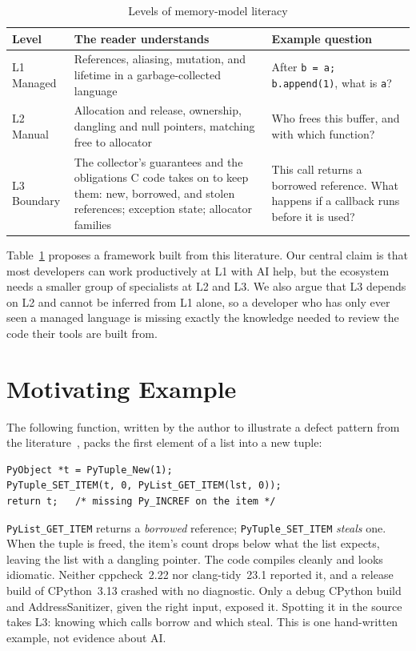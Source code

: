 \documentclass[conference]{IEEEtran}
\begin{document}
\begin{table}[t]
\caption{Levels of memory-model literacy}
\label{tab:levels}
\centering\footnotesize
\begin{tabular}{@{}p{}p{}p{}@{}}
\toprule
Level & The reader understands & Example question \\
\midrule
L1 Managed & References, aliasing, mutation, and lifetime in a garbage-collected language & After \texttt{b = a; b.append(1)}, what is \texttt{a}? \\
L2 Manual & Allocation and release, ownership, dangling and null pointers, matching free to allocator & Who frees this buffer, and with which function? \\
L3 Boundary & The collector's guarantees and the obligations C code takes on to keep them: new, borrowed, and stolen references; exception state; allocator families & This call returns a borrowed reference. What happens if a callback runs before it is used? \\
\bottomrule
\end{tabular}
\end{table}

Table~\ref{tab:levels} proposes a framework built from this literature. Our central claim is that most developers can work productively at L1 with AI help, but the ecosystem needs a smaller group of specialists at L2 and L3. We also argue that L3 depends on L2 and cannot be inferred from L1 alone, so a developer who has only ever seen a managed language is missing exactly the knowledge needed to review the code their tools are built from.

\section{Motivating Example}

The following function, written by the author to illustrate a defect pattern from the literature~\cite{huzhang2023}, packs the first element of a list into a new tuple:

\begin{lstlisting}
PyObject *t = PyTuple_New(1);
PyTuple_SET_ITEM(t, 0, PyList_GET_ITEM(lst, 0));
return t;   /* missing Py_INCREF on the item */
\end{lstlisting}

\texttt{PyList\_GET\_ITEM} returns a \emph{borrowed} reference; \texttt{PyTuple\_SET\_ITEM} \emph{steals} one. When the tuple is freed, the item's count drops below what the list expects, leaving the list with a dangling pointer. The code compiles cleanly and looks idiomatic. Neither cppcheck~2.22 nor clang-tidy~23.1 reported it, and a release build of CPython~3.13 crashed with no diagnostic. Only a debug CPython build and AddressSanitizer, given the right input, exposed it. Spotting it in the source takes L3: knowing which calls borrow and which steal. This is one hand-written example, not evidence about AI.
\end{document}
